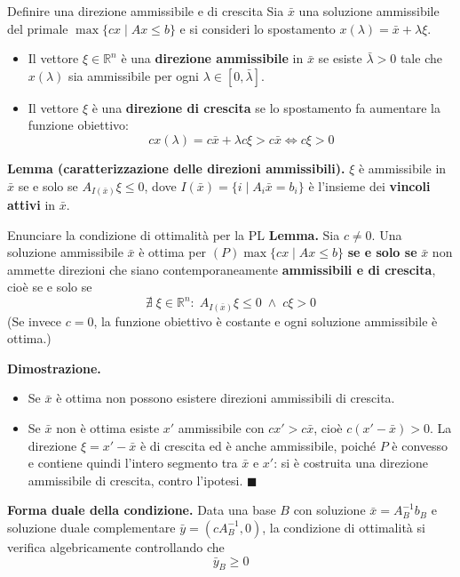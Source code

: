 \documentclass[12pt]{extarticle} %
\begin{document}
\begin{teoriabox}{Definire una direzione ammissibile e di crescita}
Sia $\bar{x}$ una soluzione ammissibile del primale $\max\{cx \mid Ax \le b\}$ e si consideri lo spostamento $x(\lambda) = \bar{x} + \lambda\xi$.
\begin{itemize}
    \item Il vettore $\xi \in \mathbb{R}^n$ è una \textbf{direzione ammissibile} in $\bar{x}$ se esiste $\bar{\lambda} > 0$ tale che $x(\lambda)$ sia ammissibile per ogni $\lambda \in [0,\bar{\lambda}]$.
    \item Il vettore $\xi$ è una \textbf{direzione di crescita} se lo spostamento fa aumentare la funzione obiettivo:
    \[
    cx(\lambda) = c\bar{x} + \lambda c\xi > c\bar{x} \iff c\xi > 0
    \]
\end{itemize}

\noindent\textbf{Lemma (caratterizzazione delle direzioni ammissibili).} $\xi$ è ammissibile in $\bar{x}$ se e solo se $A_{I(\bar{x})}\xi \le 0$, dove $I(\bar{x}) = \{i \mid A_i\bar{x} = b_i\}$ è l'insieme dei \textbf{vincoli attivi} in $\bar{x}$.
\end{teoriabox}

\begin{teoriabox}{Enunciare la condizione di ottimalità per la PL}
\textbf{Lemma.} Sia $c \ne 0$. Una soluzione ammissibile $\bar{x}$ è ottima per $(P) \max\{cx \mid Ax\le b\}$ \textbf{se e solo se} $\bar{x}$ non ammette direzioni che siano contemporaneamente \textbf{ammissibili e di crescita}, cioè se e solo se
\[
\nexists \; \xi \in \mathbb{R}^n : \; A_{I(\bar{x})}\xi \le 0 \; \wedge \; c\xi > 0
\]
(Se invece $c = 0$, la funzione obiettivo è costante e ogni soluzione ammissibile è ottima.)

\noindent\textbf{Dimostrazione.}
\begin{itemize}
    \item[$\implies$] Se $\bar{x}$ è ottima non possono esistere direzioni ammissibili di crescita.
    \item[$\impliedby$] Se $\bar{x}$ non è ottima esiste $x'$ ammissibile con $cx' > c\bar{x}$, cioè $c(x'-\bar{x}) > 0$. La direzione $\xi = x'-\bar{x}$ è di crescita ed è anche ammissibile, poiché $P$ è convesso e contiene quindi l'intero segmento tra $\bar x$ e $x'$: si è costruita una direzione ammissibile di crescita, contro l'ipotesi. $\blacksquare$
\end{itemize}
\noindent\textbf{Forma duale della condizione.} Data una base $B$ con soluzione $\bar{x} = A_B^{-1}b_B$ e soluzione duale complementare $\bar{y} = (cA_B^{-1}, 0)$, la condizione di ottimalità si verifica algebricamente controllando che
\[
\bar{y}_B \ge 0
\]
\end{teoriabox}
\end{document}
